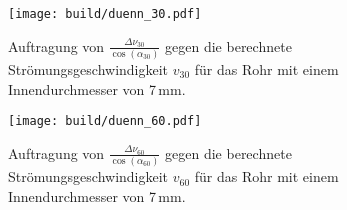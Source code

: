 \begin{figure}
  \centering
  \texttt{[image: build/duenn\_30.pdf]}
  \caption{Auftragung von $\frac{\Delta \nu_{30}}{\cos(\alpha_{30})}$ gegen die berechnete
  Strömungsgeschwindigkeit $v_{30}$ für das Rohr mit einem Innendurchmesser von 7\,mm.}
  \label{fig:duenn_30}
\end{figure}

\begin{figure}
  \centering
  \texttt{[image: build/duenn\_60.pdf]}
  \caption{Auftragung von $\frac{\Delta \nu_{60}}{\cos(\alpha_{60})}$ gegen die berechnete
  Strömungsgeschwindigkeit $v_{60}$ für das Rohr mit einem Innendurchmesser von 7\,mm.}
  \label{fig:duenn_60}
\end{figure}
